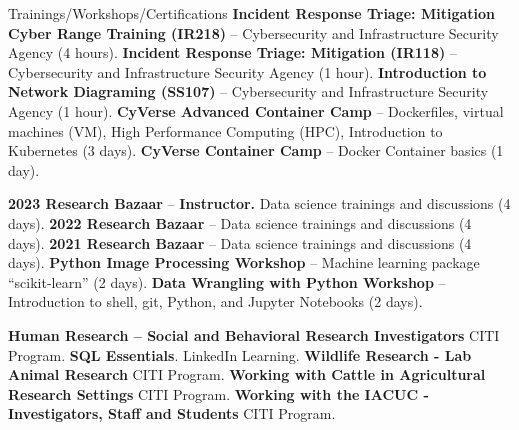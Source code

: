 \begin{rubric}{Trainings/Workshops/Certifications}
%
\entry*[5/15/2025] \textbf{Incident Response Triage: Mitigation Cyber Range Training (IR218)} -- Cybersecurity and Infrastructure Security Agency (4 hours). \href{https://github.com/amantaya/CV/blob/master/certifications/IR218_COA_051525.pdf}{\scriptsize\faLink}
%
\entry*[5/12/2025] \textbf{Incident Response Triage: Mitigation (IR118)} -- Cybersecurity and Infrastructure Security Agency (1 hour). \href{https://github.com/amantaya/curriculum-vitae/blob/master/certifications/IR118_CoA_051225.pdf}{\scriptsize\faLink}
%
\entry*[4/01/2025] \textbf{Introduction to Network Diagraming (SS107)} -- Cybersecurity and Infrastructure Security Agency (1 hour). \href{https://github.com/amantaya/CV/blob/master/certifications/SS107_APR1-2025_CertificateofAttendance.pdf}{\scriptsize\faLink}
%
\entry*[5/2022] \textbf{CyVerse Advanced Container Camp} -- Dockerfiles, virtual machines (VM), High Performance Computing (HPC), Introduction to Kubernetes (3 days).
%
\entry*[3/2021] \textbf{CyVerse Container Camp} -- Docker Container basics (1 day).

\entry*[4/2023] \textbf{2023 Research Bazaar} -- \textbf{Instructor.} Data science trainings and discussions (4 days).
\entry*[5/2022] \textbf{2022 Research Bazaar} -- Data science trainings and discussions (4 days).
\entry*[5/2021] \textbf{2021 Research Bazaar} -- Data science trainings and discussions (4 days).
\entry*[2/2020] \textbf{Python Image Processing Workshop} -- Machine learning package “scikit-learn” (2 days).
\entry*[2/2020] \textbf{Data Wrangling with Python Workshop} -- Introduction to shell, git, Python, and Jupyter Notebooks (2 days).

    \entry*[\emph{1/2024}]\textbf{Human Research -- Social and Behavioral Research Investigators} CITI Program. \href{https://github.com/amantaya/CV/blob/286493221d9eb7487b94547a68eb25f92f690e93/certifications/citi-Completion-Certificate_Human-Research_Social-Behavioral-Research-Inverstigators_Basic-Course.pdf}{\scriptsize\faLink}
    \entry*[7/2023] \textbf{SQL Essentials}. LinkedIn Learning. \href{https://github.com/amantaya/CV/blob/12c3c7c23746322f63703f2b4a97c45ef51b4da6/certifications/Certificate-Of-Completion-SQL-Essential-Training.pdf}{\scriptsize\faLink}
    \entry*[7/2021]\textbf{Wildlife Research - Lab Animal Research} CITI Program. \href{https://github.com/amantaya/CV/blob/286493221d9eb7487b94547a68eb25f92f690e93/certifications/citi-Completion-Certificate_Wildlife-Research_Wildlife-Research_Lab-Animal-Research.pdf}{\scriptsize\faLink}
    \entry*[7/2021]\textbf{Working with Cattle in Agricultural Research Settings} CITI Program. \href{https://github.com/amantaya/CV/blob/286493221d9eb7487b94547a68eb25f92f690e93/certifications/citi-Completion-Certificate_Working-with-Cattle-in-Agricultural-Research-Settings_Basic-Course.pdf}{\scriptsize\faLink}
    \entry*[7/2021]\textbf{Working with the IACUC - Investigators, Staff and Students} CITI Program. \href{https://github.com/amantaya/CV/blob/286493221d9eb7487b94547a68eb25f92f690e93/certifications/citi-Completion-Certificate_Working-with-the-IACUC_Working-with-the-IACUC-Investigators-Staff-Students_Basic-Course.pdf}{\scriptsize\faLink}

\end{rubric}
